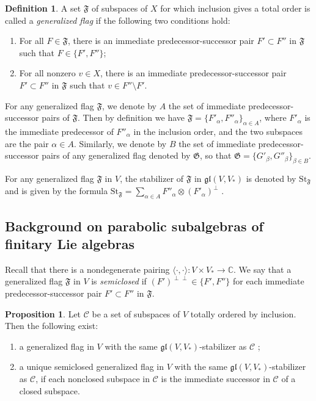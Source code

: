 \documentclass{amsart}
\theoremstyle{definition}
\newtheorem{definition}[theorem]{Definition}
\newtheorem{prop}[theorem]{Proposition}
\theoremstyle{remark}
\numberwithin{equation}{section}
\newcommand {\C} {\mathbb{C}}
\newcommand {\St} {\mathrm{St}}
\def\gl{\mathfrak {gl}}
\def\F{\mathfrak{F}}
\def\G{\mathfrak{G}}
\def\Ch{\mathcal{C}}
\begin{document}
\begin{definition} \cite{DimitrovP1}
A set $\F$ of subspaces of $X$ for which inclusion gives a total order is called a \emph{generalized flag} if the following two conditions hold:
\begin{enumerate}
\item For all $F \in \F$, there is an immediate predecessor-successor pair $F' \subset F''$ in $\F$ such that $F \in \{ F' , F'' \}$;
\item For all nonzero $v \in X$, there is an immediate predecessor-successor pair $F' \subset F''$ in $\F$ such that $v \in F'' \setminus F'$.
\end{enumerate}
\end{definition}

For any generalized flag $\F$, we denote by $A$ the set of immediate predecessor-successor pairs of $\F$.  Then by definition we have $\F = \{F'_\alpha , F''_\alpha \}_{\alpha \in A}$, where $F'_\alpha$ is the immediate predecessor of $F''_\alpha$ in the inclusion order, and the two subspaces are the pair $\alpha \in A$.   Similarly, we denote by $B$ the set of immediate predecessor-successor pairs of any generalized flag denoted by $\G$, so that $\G = \{G'_\beta, G''_\beta \}_{\beta \in B}$.  

For any generalized flag $\F$ in $V$, the stabilizer of $\F$ in $\gl(V,V_*)$ is denoted by $\St_\F$ and is given by the formula $\St_\F = \sum_{\alpha \in A} F''_\alpha \otimes (F'_\alpha)^\perp$ \cite{DimitrovP1}. 


\subsection{Background on parabolic subalgebras of finitary Lie algebras}



Recall that there is a nondegenerate pairing $\langle \cdot , \cdot \rangle : V \times V_* \rightarrow \C$.
We say that a generalized flag $\F$ in $V$ is \emph{semiclosed} if $(F')^{\perp \perp} \in \{ F' , F'' \}$
for each immediate predecessor-successor pair $F' \subset F''$ in $\F$.  

\begin{prop} \label{genf}
 Let $\Ch$ be a set of subspaces of $V$ totally ordered by inclusion.  Then the following exist:
\begin{enumerate}
\item a generalized flag in $V$ with the same $\gl(V,V_*)$-stabilizer as $\Ch$ \cite{DimitrovP1};
\item \label{uniquesemic}  a unique semiclosed generalized flag in $V$ with the same $\gl(V,V_*)$-stabilizer as $\Ch$, if each nonclosed subspace in $\Ch$ is the immediate successor in $\Ch$ of a closed subspace.
\end{enumerate}
\end{prop}
\end{document}
